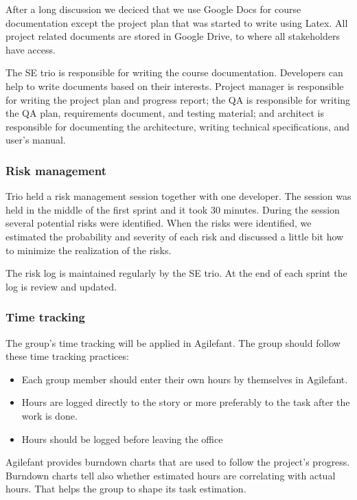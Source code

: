 After a long discussion we deciced that we use Google Docs for course
documentation except the project plan that was started to write using Latex. All
project related documents are stored in Google Drive, to where all stakeholders
have access.

The SE trio is responsible for writing the course documentation. 
Developers can help to write documents based on their interests. Project manager
is responsible for writing the project plan and progress report; the QA is
responsible for writing the QA plan, requirements document, and testing
material; and architect is responsible for documenting the architecture, writing
technical specifications, and user's manual.

\subsubsection{Risk management}

Trio held a risk management session together with one developer. The session was
held in the middle of the first sprint and it took 30 minutes. During the
session several potential risks were identified. When the risks were
identified, we estimated the probability and severity of each risk and discussed a little
bit how to minimize the realization of the risks.

The risk log is maintained regularly by the SE trio. At the end of each sprint
the log is review and updated.

\subsubsection{Time tracking}

The group's time tracking will be applied in Agilefant. The group should follow 
these time tracking practices:
\begin{itemize}
\item Each group member should enter their own hours by themselves in 
Agilefant.
\item Hours are logged directly to the story or more preferably to the task 
after the work is done. 
\item Hours should be logged before leaving the office
\end{itemize}

Agilefant provides burndown charts that are used to follow the project's
progress. Burndown charts tell also whether estimated hours are correlating with
actual hours. That helps the group to shape its task estimation.

